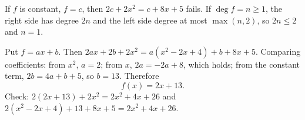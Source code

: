 If $f$ is constant, $f=c$, then $2c+2x^2=c+8x+5$ fails. If $\deg f=n\ge1$, the right side has degree $2n$ and the left side degree at most $\max(n,2)$, so $2n\le2$ and $n=1$.

Put $f=ax+b$. Then $2ax+2b+2x^2=a(x^2-2x+4)+b+8x+5$. Comparing coefficients: from $x^2$, $a=2$; from $x$, $2a=-2a+8$, which holds; from the constant term, $2b=4a+b+5$, so $b=13$. Therefore
\[\boxed{f(x)=2x+13}.\]
Check: $2(2x+13)+2x^2=2x^2+4x+26$ and $2(x^2-2x+4)+13+8x+5=2x^2+4x+26$.
